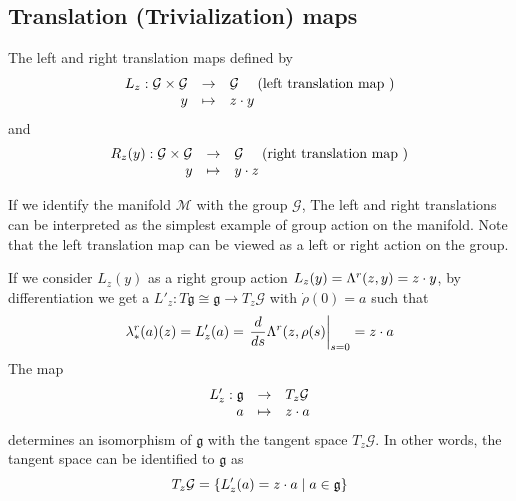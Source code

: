 \subsection{Translation (Trivialization) maps}
The left and right translation maps defined by 
\begin{equation}
  \label{eq:148}
  \begin{array}{rcl}
    L_z  : \mathcal G \times \mathcal G &\rightarrow& \mathcal G \quad \text{ (left translation map )} \\
    y &\mapsto&  z \cdot y
  \end{array}
\end{equation}
and 
\begin{equation}
  \label{eq:149}
  \begin{array}{rcl}
    R_z(y)  :  \mathcal G \times  \mathcal G  & \rightarrow& \mathcal G \quad \text{ (right translation map )} \\
    y  &\mapsto&  y \cdot z 
  \end{array}
\end{equation}

If we identify the manifold $\mathcal M$ with the group $\mathcal G$, The left and right translations can be interpreted as the simplest example of group action on the manifold. Note that the left translation map can be viewed as a left or right action on the group.

If we consider $L_z(y)$ as a right group action $ L_z(y) = \Lambda^r( z, y) =z \cdot y $, by differentiation we get a $L'_z : T \mathfrak g \cong  \mathfrak g \rightarrow T_z\mathcal G$ with $\dot\rho (0)=a$ such that
\begin{equation}
  \label{eq:150}
  \lambda^r_{*}(a)(z) = L'_z(a) = \left.\frac{d}{ds}{ \Lambda^r (z, \rho(s)}\right|_{s=0} = z \cdot a
\end{equation}
The map
\begin{equation}
  \label{eq:152}
  \begin{array}{rcl}
  L'_z  : \mathfrak g &\rightarrow& T_z\mathcal G  \\
         a &\mapsto&  z \cdot a
  \end{array}
\end{equation}
determines an isomorphism of $\mathfrak g$ with the tangent space  $T_z\mathcal G$. In other words, the  tangent space can be identified to $\mathfrak g$ as
\begin{equation}
  \label{eq:153}
  T_z\mathcal G =\{L'_z(a) = z \cdot a \mid a \in \mathfrak g  \}
\end{equation}

